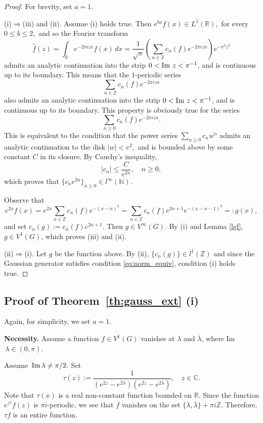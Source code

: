 \documentclass[12pt]{amsart}
\numberwithin{equation}{section}
\theoremstyle{plain}
\theoremstyle{definition}
\newcommand{\R}{{\mathbb R}} \newcommand{\Q}{{\mathbb Q}} \newcommand{\Z}{{\mathbb Z}} \newcommand{\N}{{\mathbb N}}
\newcommand{\Cc}{{\mathbb C}}
\begin{document}
\begin{proof}

For brevity, set $a=1$.

(i)$\Rightarrow$(iii) and  (ii).
Assume (i) holds true. Then $e^{bx}f(x)\in L^1(\R),$ for every $0\leq b\leq 2,$ and so the Fourier transform
$$\hat f(z)=\int_\R e^{-2\pi izx}f(x)\,dx=\frac{1}{\sqrt\pi}\left(\sum_{n\in\Z}c_n(f)e^{-2\pi izn}\right)e^{-\pi^2 z^2}
$$admits an analytic continuation into the strip $0< {\rm Im\,}\,z<\pi^{-1}$, and is continuous up to its boundary. This means that the $1$-periodic series
$$\sum_{n\in\Z}c_n(f)e^{-2\pi izn}$$ also admits an analytic continuation into the strip $0< {\rm Im\,}\,z<\pi^{-1}$, and is continuous up to its boundary. 
This property is obviously true for the series $$\sum_{n\geq0}c_n(f)e^{-2\pi izn}.$$This is equivalent to the condition that the power series
$\sum_{n\geq0}c_nw^n$ admits an analytic continuation to the disk $|w|<e^2,$ and is bounded above by some constant $C$ in its closure. By  Cauchy's inequality,
$$|c_n|\leq \frac{C}{e^{2n}},\quad n\geq0,$$which proves that $\{c_n e^{2n}\}_{n\geq0}\in l^\infty(\mathbb N).$ 

Observe that 
$$e^{2x}f(x)=e^{2x}\sum_{n\in\Z}c_n(f)e^{-(x-n)^2}=\sum_{n\in\Z}c_n(f)e^{2n+1}e^{-(x-n-1)^2}=:g(x),$$and set $c_n(g):=c_n(f)e^{2n+1}.$
Then $g\in V^\infty(G).$ 
By (i) and Lemma \ref{lgf}, $g\in V^1(G)$, which proves (iii) and (ii).


(ii)$\Rightarrow$(i). Let $g$ be the function above.
By (ii), $\{c_n(g)\}\in l^1(\Z)$ and since the Gaussian generator satisfies condition \eqref{eq:norm_equiv},  condition (i) holds true.

\end{proof}




\subsection{Proof of Theorem~\ref{th:gauss_ext} {\rm (i)}}\label{sec1}

Again, for simplicity, we set $a=1$. 

{\bf Necessity.}  
Assume a  function $f\in V^1(G)$  vanishes at $\lambda$ and $\bar\lambda$, where Im$\,\lambda\in(0,\pi)$.

 Assume $\, {\rm Im\,}\lambda\ne\pi/2.$ 
Set
$$
\tau(z) := \frac{1}{(e^{2z} - e^{2\lambda})(e^{2z} - e^{2 \bar\lambda})}, \quad z \in \Cc.
$$
Note that $\tau(x)$ is a real non-constant function bounded on $\R$.
Since the function $e^{z^2}f(z)$ is $\pi i$-periodic, we see that  $f$ vanishes on the set $\{\lambda,\bar\lambda\}+\pi i \Z.$ Therefore, $\tau f$ is an entire function.
\end{document}
